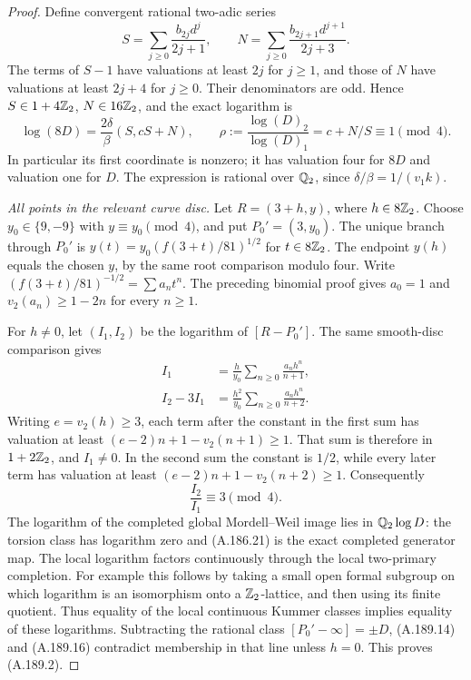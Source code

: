 \begin{proof}
Define convergent rational two-adic series
\[
 S=\sum_{j\geq0}\frac{b_{2j}d^j}{2j+1},\qquad
 N=\sum_{j\geq0}\frac{b_{2j+1}d^{j+1}}{2j+3}.
\tag{A.189.13}
\]
The terms of \(S-1\) have valuations at least
\(2j\) for \(j\geq1\), and those of \(N\)
have valuations at least \(2j+4\) for \(j\geq0\).
Their denominators are odd.  Hence
\(S\in1+4\mathbb Z_2\), \(N\in16\mathbb Z_2\), and
the exact logarithm is
\[
 \log(8D)=\frac{2\delta}{\beta}(S,cS+N),\qquad
       \rho:=\frac{\log(D)_2}{\log(D)_1}
                      =c+N/S\equiv1\pmod4.
\tag{A.189.14}
\]
In particular its first coordinate is nonzero; it
has valuation four for \(8D\) and valuation one
for \(D\).  The expression is rational over
\(\mathbb Q_2\), since \(\delta/\beta=1/(v_1k)\).

\emph{All points in the relevant curve disc.}
Let \(R=(3+h,y)\), where \(h\in8\mathbb Z_2\).
Choose \(y_0\in\{9,-9\}\) with
\(y\equiv y_0\pmod4\), and put
\(P_0'=(3,y_0)\).  The unique branch through
\(P_0'\) is
\(y(t)=y_0(f(3+t)/81)^{1/2}\) for
\(t\in8\mathbb Z_2\).  The endpoint \(y(h)\)
equals the chosen \(y\), by the same root comparison
modulo four.  Write
\((f(3+t)/81)^{-1/2}=\sum a_nt^n\).
The preceding binomial proof gives
\(a_0=1\) and \(v_2(a_n)\geq1-2n\) for
every \(n\geq1\).

For \(h\ne0\), let \((I_1,I_2)\) be the
logarithm of \([R-P_0']\).  The same smooth-disc
comparison gives
\[
\begin{aligned}
 I_1&=\frac{h}{y_0}
       \sum_{n\geq0}\frac{a_nh^n}{n+1},\\
 I_2-3I_1&=\frac{h^2}{y_0}
       \sum_{n\geq0}\frac{a_nh^n}{n+2}.
\end{aligned}
\tag{A.189.15}
\]
Writing \(e=v_2(h)\geq3\), each term after the
constant in the first sum has valuation at least
\((e-2)n+1-v_2(n+1)\geq1\).
That sum is therefore in \(1+2\mathbb Z_2\), and
\(I_1\ne0\).  In the second sum the constant
is \(1/2\), while every later term has valuation
at least \((e-2)n+1-v_2(n+2)\geq1\).
Consequently
\[
                    \frac{I_2}{I_1}\equiv3\pmod4.
\tag{A.189.16}
\]
The logarithm of the completed global Mordell--Weil
image lies in \(\mathbb Q_2\log D\): the torsion class
has logarithm zero and (A.186.21) is the exact
completed generator map.  The local logarithm
factors continuously through the local two-primary
completion.  For example this follows by taking a
small open formal subgroup on which logarithm is
an isomorphism onto a \(\mathbb Z_2\)-lattice, and then
using its finite quotient.  Thus equality of the
local continuous Kummer classes implies equality
of these logarithms.  Subtracting the rational
class \([P_0'-\infty]=\pm D\), (A.189.14) and
(A.189.16) contradict membership in that line
unless \(h=0\).  This proves (A.189.2).


\end{proof}

